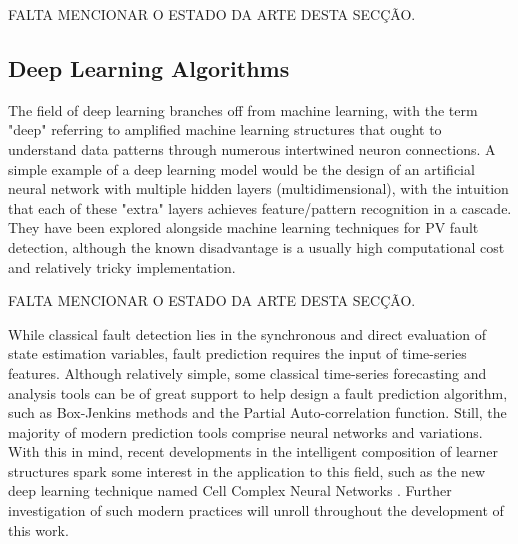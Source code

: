 FALTA MENCIONAR O ESTADO DA ARTE DESTA SECÇÃO.

\subsection{Deep Learning Algorithms}

The field of deep learning branches off from machine learning, with the term "deep" referring to amplified machine learning structures that ought to understand data patterns through numerous intertwined neuron connections. A simple example of a deep learning model would be the design of an artificial neural network with multiple hidden layers (multidimensional), with the intuition that each of these "extra" layers achieves feature/pattern recognition in a cascade. They have been explored alongside machine learning techniques for PV fault detection, although the known disadvantage is a usually high computational cost and relatively tricky implementation.

FALTA MENCIONAR O ESTADO DA ARTE DESTA SECÇÃO.

While classical fault detection lies in the synchronous and direct evaluation of state estimation variables, fault prediction requires the input of time-series features. Although relatively simple, some classical time-series forecasting and analysis tools can be of great support to help design a fault prediction algorithm, such as Box-Jenkins methods and the Partial Auto-correlation function. Still, the majority of modern prediction tools comprise neural networks and variations. With this in mind, recent developments in the intelligent composition of learner structures spark some interest in the application to this field, such as the new deep learning technique named Cell Complex Neural Networks \cite{Hajij2020}. Further investigation of such modern practices will unroll throughout the development of this work.


